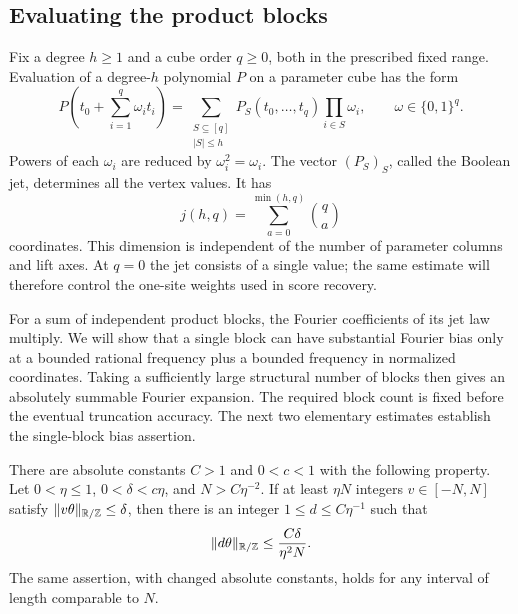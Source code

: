 \subsection{Evaluating the product blocks}

Fix a degree $h\ge1$ and a cube order $q\ge0$, both in the
prescribed fixed range. Evaluation of a degree-$h$ polynomial
$P$ on a parameter cube has the form
\[
 P\left(t_0+\sum_{i=1}^q\omega_it_i\right)
 =\sum_{\substack{S\subseteq[q]\\|S|\le h}}
       P_S(t_0,\ldots,t_q)\prod_{i\in S}\omega_i,
 \qquad\omega\in\{0,1\}^q.
\]
Powers of each $\omega_i$ are reduced by $\omega_i^2=\omega_i$.
The vector $(P_S)_S$, called the Boolean jet, determines all the
vertex values. It has
\begin{equation}
 j(h,q)=\sum_{a=0}^{\min(h,q)}\binom qa
 \label{cube:jet-dimension}
\end{equation}
coordinates. This dimension is independent of the number of
parameter columns and lift axes. At $q=0$ the jet consists of a
single value; the same estimate will therefore control the
one-site weights used in score recovery.

For a sum of independent product blocks, the Fourier coefficients
of its jet law multiply. We will show that a single block can
have substantial Fourier bias only at a bounded rational
frequency plus a bounded frequency in normalized coordinates.
Taking a sufficiently large structural number of blocks then
gives an absolutely summable Fourier expansion. The required
block count is fixed before the eventual truncation accuracy.
The next two elementary estimates establish the single-block
bias assertion.

\begin{lemma}
\label{cube:many-multiples}
There are absolute constants $C>1$ and $0<c<1$ with the following property.
Let $0<\eta\le1$, $0<\delta<c\eta$, and $N>C\eta^{-2}$.
If at least $\eta N$ integers $v\in[-N,N]$ satisfy
$\|v\theta\|_{\mathbb R/\mathbb Z}\le\delta$, then there is an integer
$1\le d\le C\eta^{-1}$ such that
\[
                  \|d\theta\|_{\mathbb R/\mathbb Z}
                    \le \frac{C\delta}{\eta^2N}.
\]
The same assertion, with changed absolute constants, holds for any
interval of length comparable to $N$.
\end{lemma}

